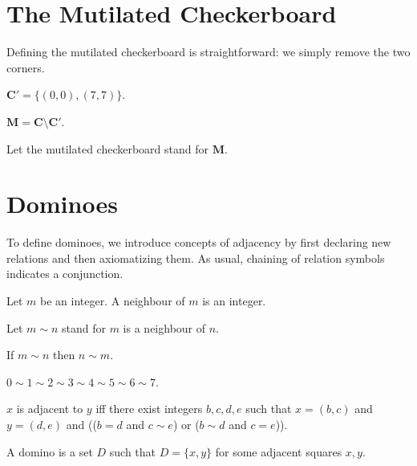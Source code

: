 \documentclass{article}
\newcommand{\Checkerboard}{\mathbf{C}}
\newcommand{\Corners}{\mathbf{C'}}
\newcommand{\Mutilated}{\mathbf{M}}
\begin{document}
\section{The Mutilated Checkerboard}

Defining the mutilated checkerboard is straightforward:
we simply remove the two corners.

\begin{forthel}
    \begin{definition}
        $\Corners = \{ (0, 0), (7, 7) \}$.
    \end{definition}

    \begin{definition}
        $\Mutilated = \Checkerboard \setminus \Corners$.
    \end{definition}

    Let the mutilated checkerboard stand for $\Mutilated$.
\end{forthel}



\section{Dominoes}

To define dominoes,
we introduce concepts of adjacency by first declaring new relations and then axiomatizing them.
As usual, chaining of relation symbols indicates a conjunction.

\begin{forthel}
    \begin{signature}
        Let $m$ be an integer. A neighbour of $m$ is an integer.
    \end{signature}
    Let $m\sim n$ stand for $m$ is a neighbour of $n$.

    \begin{axiom}
        If $m\sim n$ then $n\sim m$.
    \end{axiom}
    \begin{axiom}
        $0\sim 1\sim 2\sim 3\sim 4\sim 5\sim 6\sim 7$.
    \end{axiom}

    \begin{definition}
        $x$ is adjacent to $y$ iff
        there exist integers $b, c, d, e$ such that
        $x = (b, c)$ and $y = (d, e)$ and
        (($b = d$  and $c\sim e$) or
        ($b\sim d$ and $c = e$)).
    \end{definition}

    \begin{definition}
        A domino is a set $D$ such that $D = \{x, y\}$ for some
        adjacent squares $x, y$.
    \end{definition}
\end{forthel}
\end{document}
